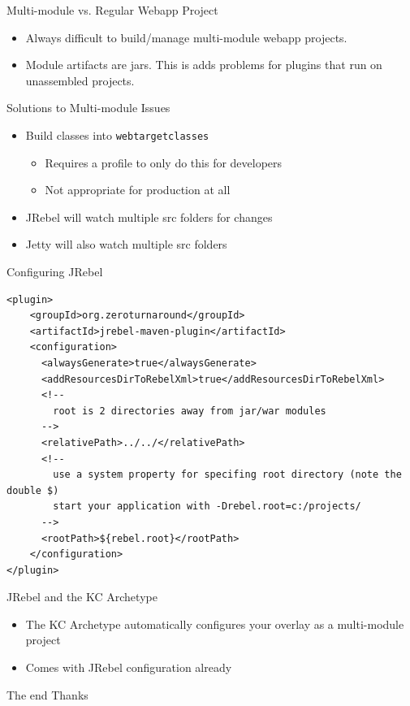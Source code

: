 \documentclass[xcolor=dvipsnames,14pt,professionalfonts]{beamer}
\begin{document}
\begin{frame}{Multi-module vs. Regular Webapp Project}
  \begin{itemize}
    \item Always difficult to build/manage multi-module webapp
      projects.
    \item Module artifacts are jars. This is adds problems for plugins that run on unassembled projects.
  \end{itemize}
\end{frame}

\begin{frame}{Solutions to Multi-module Issues}
  \begin{itemize}
    \item Build classes into \texttt{web\/target\/classes}
      \begin{itemize}
        \item Requires a profile to only do this for developers
        \item Not appropriate for production at all
      \end{itemize}
    \item JRebel will watch multiple src folders for changes
    \item Jetty will also watch multiple src folders
  \end{itemize}
\end{frame}

\begin{frame}[fragile]{Configuring JRebel}
  \begin{verbatim}
<plugin>
    <groupId>org.zeroturnaround</groupId>
    <artifactId>jrebel-maven-plugin</artifactId>
    <configuration>
      <alwaysGenerate>true</alwaysGenerate>
      <addResourcesDirToRebelXml>true</addResourcesDirToRebelXml>
      <!--
        root is 2 directories away from jar/war modules
      -->
      <relativePath>../../</relativePath>
      <!--
        use a system property for specifing root directory (note the double $)
        start your application with -Drebel.root=c:/projects/
      -->
      <rootPath>${rebel.root}</rootPath>
    </configuration>
</plugin>
    \end{verbatim}
\end{frame}

\begin{frame}{JRebel and the KC Archetype}
\begin{itemize}
  \item The KC Archetype automatically configures your overlay as a multi-module project
  \item Comes with JRebel configuration already
\end{itemize}
\end{frame}

\begin{frame}{The end}
Thanks
\end{frame}
\end{document}
